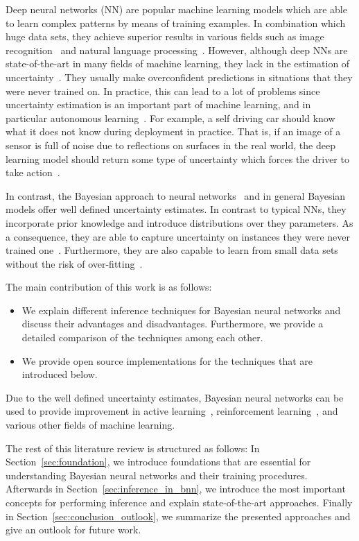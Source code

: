 \documentclass[runningheads]{llncs}
\begin{document}
Deep neural networks (NN) are popular machine learning models which are able to learn complex patterns by means of training examples.
In combination which huge data sets, they achieve superior results in various fields such as image recognition~\cite{efficient_net,multigrain} and natural language processing~\cite{nlp1,nlp2}.
However, although deep NNs are state-of-the-art in many fields of machine learning, they lack in the estimation of uncertainty~\cite{Gal2015Bayesian,Kendall2017Uncertainy}.
They usually make overconfident predictions in situations that they were never trained on.
In practice, this can lead to a lot of problems since uncertainty estimation is an important part of machine learning, and in particular autonomous learning~\cite{gal2017deep}.
For example, a self driving car should know what it does not know during deployment in practice.
That is, if an image of a sensor is full of noise due to reflections on surfaces in the real world, the deep learning model should return some type of uncertainty which forces the driver to take action~\cite{car_accident}.

In contrast, the Bayesian approach to neural networks~\cite{mackay1992practical,Neal:1995:BLN:922680} and in general Bayesian models offer well defined uncertainty estimates.
In contrast to typical NNs, they incorporate prior knowledge and introduce distributions over they parameters.
As a consequence, they are able to capture uncertainty on instances they were never trained one~\cite{Kendall2017Uncertainy}.
Furthermore, they are also capable to learn from small data sets without the risk of over-fitting~\cite{Gal2015Bayesian}.

The main contribution of this work is as follows:
\begin{itemize}
\item We explain different inference techniques for Bayesian neural networks and discuss their advantages and disadvantages. 
Furthermore, we provide a detailed comparison of the techniques among each other.
\item We provide open source implementations for the techniques that are introduced below.
\end{itemize}
Due to the well defined uncertainty estimates, Bayesian neural networks can be used to provide improvement in active learning~\cite{gal2017deep,hernandez2015probabilistic}, reinforcement learning~\cite{BlundellBBB,Gal2016Dropout}, and various other fields of machine learning.

The rest of this literature review is structured as follows: 
In Section~\ref{sec:foundation}, we introduce foundations that are essential for understanding Bayesian neural networks and their training procedures.
Afterwards in Section~\ref{sec:inference_in_bnn}, we introduce the most important concepts for performing inference and explain state-of-the-art approaches.
Finally in Section~\ref{sec:conclusion_outlook}, we summarize the presented approaches and give an outlook for future work.
\end{document}
